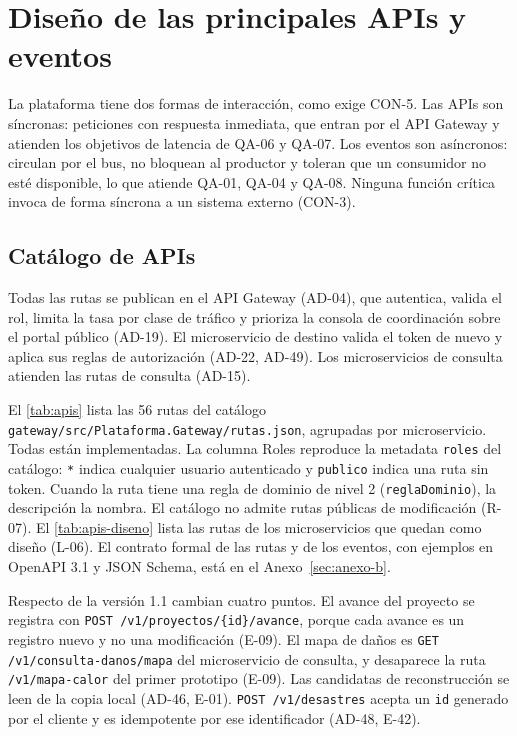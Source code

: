 \documentclass[11pt,letterpaper]{article}
\providecommand{\br}{\discretionary{}{}{}}
\begin{document}
\section{Diseño de las principales APIs y eventos}
\label{sec:apis-eventos}

La plataforma tiene dos formas de interacción, como exige CON-5. Las APIs son síncronas: peticiones
con respuesta inmediata, que entran por el API Gateway y atienden los objetivos de latencia de QA-06
y QA-07. Los eventos son asíncronos: circulan por el bus, no bloquean al productor y toleran que un
consumidor no esté disponible, lo que atiende QA-01, QA-04 y QA-08. Ninguna función crítica invoca
de forma síncrona a un sistema externo (CON-3).

\subsection{Catálogo de APIs}
\label{sec:apis}

Todas las rutas se publican en el API Gateway (AD-04), que autentica, valida el rol, limita la tasa
por clase de tráfico y prioriza la consola de coordinación sobre el portal público (AD-19). El
microservicio de destino valida el token de nuevo y aplica sus reglas de autorización (AD-22,
AD-49). Los microservicios de consulta atienden las rutas de consulta (AD-15).

El \cref{tab:apis} lista las 56 rutas del catálogo \texttt{gateway/\br{}src/\br{}Plataforma.\br{}Gateway/\br{}rutas.\br{}json},
agrupadas por microservicio. Todas están implementadas. La columna Roles reproduce la metadata
\texttt{roles} del catálogo: \texttt{*} indica cualquier usuario autenticado y \texttt{publico}
indica una ruta sin token. Cuando la ruta tiene una regla de dominio de nivel 2
(\texttt{reglaDominio}), la descripción la nombra. El catálogo no admite rutas públicas de
modificación (R-07). El \cref{tab:apis-diseno} lista las rutas de los microservicios que quedan
como diseño (L-06). El contrato formal de las rutas y de los eventos, con ejemplos en OpenAPI 3.1 y
JSON Schema, está en el Anexo~\ref{sec:anexo-b}.

Respecto de la versión 1.1 cambian cuatro puntos. El avance del proyecto se registra con
\texttt{POST /v1/proyectos/\{id\}/avance}, porque cada avance es un registro nuevo y no una
modificación (E-09). El mapa de daños es \texttt{GET /\br{}v1/\br{}consulta-\br{}danos/\br{}mapa} del microservicio de
consulta, y desaparece la ruta \texttt{/\br{}v1/\br{}mapa-\br{}calor} del primer prototipo (E-09). Las
candidatas de reconstrucción se leen de la copia local (AD-46, E-01). \texttt{POST /\br{}v1/\br{}desastres}
acepta un \texttt{id} generado por el cliente y es idempotente por ese identificador (AD-48, E-42).
\end{document}
